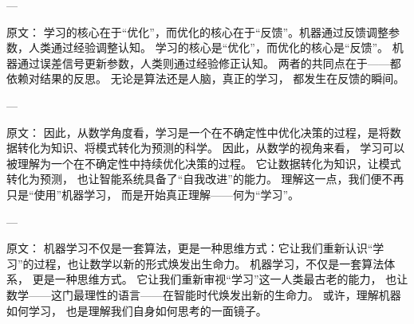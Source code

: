 ---

原文：
学习的核心在于“优化”，而优化的核心在于“反馈”。机器通过反馈调整参数，人类通过经验调整认知。
学习的核心是“优化”，而优化的核心是“反馈”。  
机器通过误差信号更新参数，人类则通过经验修正认知。  
两者的共同点在于——都依赖对结果的反思。  
无论是算法还是人脑，真正的学习，  
都发生在反馈的瞬间。

---

原文：
因此，从数学角度看，学习是一个在不确定性中优化决策的过程，是将数据转化为知识、将模式转化为预测的科学。
因此，从数学的视角来看，  
学习可以被理解为一个在不确定性中持续优化决策的过程。  
它让数据转化为知识，让模式转化为预测，  
也让智能系统具备了“自我改进”的能力。  
理解这一点，我们便不再只是“使用”机器学习，  
而是开始真正理解——何为“学习”。

---

原文：
机器学习不仅是一套算法，更是一种思维方式：它让我们重新认识“学习”的过程，也让数学以新的形式焕发出生命力。
机器学习，不仅是一套算法体系，  
更是一种思维方式。  
它让我们重新审视“学习”这一人类最古老的能力，  
也让数学——这门最理性的语言——在智能时代焕发出新的生命力。  
或许，理解机器如何学习，  
也是理解我们自身如何思考的一面镜子。


\nocite{*}
\newpage
